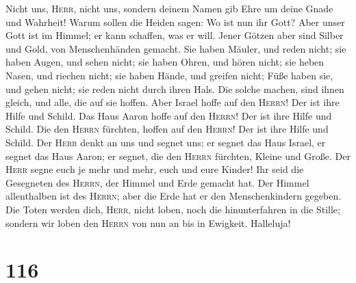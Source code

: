  Nicht uns, \textsc{Herr}, nicht uns, sondern deinem Namen
gib Ehre um deine Gnade und Wahrheit!  Warum sollen die
Heiden sagen: Wo ist nun ihr Gott?  Aber unser Gott ist im
Himmel; er kann schaffen, was er will.  Jener Götzen aber
sind Silber und Gold, von Menschenhänden gemacht.  Sie
haben Mäuler, und reden nicht; sie haben Augen, und sehen nicht;
 sie haben Ohren, und hören nicht; sie heben Nasen, und
riechen nicht;  sie haben Hände, und greifen nicht; Füße
haben sie, und gehen nicht; sie reden nicht durch ihren Hals.
 Die solche machen, sind ihnen gleich, und alle, die auf
sie hoffen.  Aber Israel hoffe auf den \textsc{Herrn}! Der
ist ihre Hilfe und Schild.  Das Haus Aaron hoffe auf den
\textsc{Herrn}! Der ist ihre Hilfe und Schild.  Die den
\textsc{Herrn} fürchten, hoffen auf den \textsc{Herrn}! Der ist ihre
Hilfe und Schild.  Der \textsc{Herr} denkt an uns und
segnet uns; er segnet das Haus Israel, er segnet das Haus Aaron;
 er segnet, die den \textsc{Herrn} fürchten, Kleine und
Große.  Der \textsc{Herr} segne euch je mehr und mehr,
euch und eure Kinder!  Ihr seid die Gesegneten des
\textsc{Herrn}, der Himmel und Erde gemacht hat.  Der
Himmel allenthalben ist des \textsc{Herrn}; aber die Erde hat er den
Menschenkindern gegeben.  Die Toten werden dich,
\textsc{Herr}, nicht loben, noch die hinunterfahren in die Stille;
 sondern wir loben den \textsc{Herrn} von nun an bis in
Ewigkeit. Halleluja!

\hypertarget{section-115}{%
\section{116}\label{section-115}}


